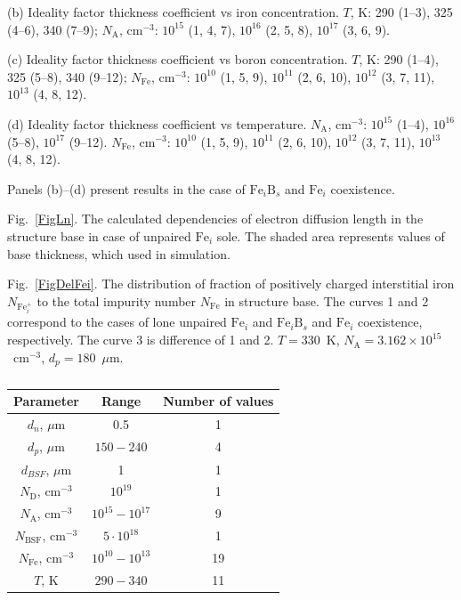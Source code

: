\documentclass[12pt]{article}
\begin{document}
(b) Ideality factor thickness coefficient vs iron concentration.
$T$, K: 290 (1--3), 325 (4--6), 340 (7--9);
$N_\mathrm{A}$, cm$^{-3}$: $10^{15}$ (1, 4, 7), $10^{16}$ (2, 5, 8),  $10^{17}$ (3, 6, 9).

(c) Ideality factor thickness coefficient vs boron concentration.
$T$, K: 290 (1--4), 325 (5--8), 340 (9--12);
$N_\mathrm{Fe}$, cm$^{-3}$: $10^{10}$ (1, 5, 9), $10^{11}$ (2, 6, 10),  $10^{12}$ (3, 7, 11), $10^{13}$ (4, 8, 12).

(d) Ideality factor thickness coefficient vs temperature.
$N_\mathrm{A}$, cm$^{-3}$: $10^{15}$ (1--4), $10^{16}$ (5--8),  $10^{17}$ (9--12).
$N_\mathrm{Fe}$, cm$^{-3}$: $10^{10}$ (1, 5, 9), $10^{11}$ (2, 6, 10),  $10^{12}$ (3, 7, 11), $10^{13}$ (4, 8, 12).

Panels (b)--(d) present results in  the case of $\mathrm{Fe}_i\mathrm{B}_s$ and $\mathrm{Fe}_i$ coexistence.

 Fig.~\ref{FigLn}.
The calculated dependencies of electron diffusion length in the structure base
in case of unpaired $\mathrm{Fe}_i$ sole.
The shaded area represents values of base thickness, which used in simulation.

 Fig.~\ref{FigDelFei}.
The distribution of fraction of positively charged interstitial iron $N_{\mathrm{Fe}_i^+}$ to the total
impurity number $N_{\mathrm{Fe}}$ in structure base.
The curves 1 and 2 correspond to the cases of lone unpaired $\mathrm{Fe}_i$ and $\mathrm{Fe}_i\mathrm{B}_s$ and $\mathrm{Fe}_i$ coexistence,
respectively.
The curve 3 is difference of 1 and 2.
$T=330$~K, $N_\mathrm{A}=3.162\times10^{15}$~cm$^{-3}$, $d_p=180$~$\mu$m.



\newpage

\begin{table}
\caption{\label{tabParametr}
}
\begin{tabular}{|c|c|c|}
\hline
Parameter& Range& Number of values\\
\hline
$d_n$, $\mu$m&0.5&1\\
\hline
$d_p$, $\mu$m&$150-240$&4\\
\hline
$d_{BSF}$, $\mu$m&1&1\\
\hline
$N_\mathrm{D}$, cm$^{-3}$&$10^{19}$&1\\
\hline
$N_\mathrm{A}$, cm$^{-3}$&$10^{15}-10^{17}$&9\\
\hline
$N_\mathrm{BSF}$, cm$^{-3}$&$5\cdot10^{18}$&1\\
\hline
$N_\mathrm{Fe}$, cm$^{-3}$&$10^{10}-10^{13}$&19\\
\hline
$T$, K&$290-340$&11\\
\hline
\end{tabular}
\end{table}
\end{document}
